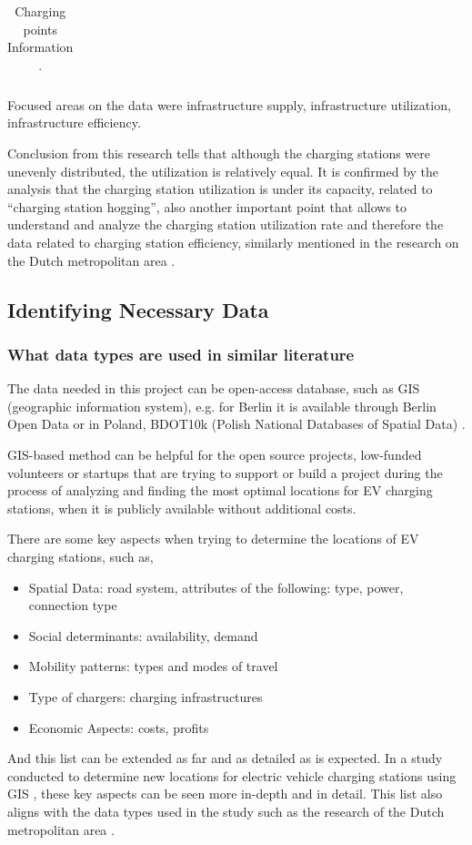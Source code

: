 \begin{table}[!h]
\begin{center}
\begin{tabular}{|l|l|l|l|l|}
\end{tabular}
\caption{Charging points Information .\cite{BerlinCampaign2024}}
\end{center}
\end{table}

Focused areas on the data were infrastructure supply, infrastructure utilization, infrastructure efficiency.

Conclusion from this research tells that although the charging stations were unevenly distributed, the utilization is relatively equal. It is confirmed by the analysis that the charging station utilization is under its capacity, related to “charging station hogging”, also another important point that allows to understand and analyze the charging station utilization rate and therefore the data related to charging station efficiency, similarly mentioned in the research on the Dutch metropolitan area \cite{Wolbertus2016}.


\subsection{Identifying Necessary Data}\label{sec:44}
\subsubsection{What data types are used in similar literature}\label{sec:45}

The data needed in this project can be open-access database, such as GIS (geographic information system), e.g. for Berlin it is available through Berlin Open Data \cite{berlin-data} or in Poland, BDOT10k (Polish National Databases of Spatial Data) \cite{bdot10k}.

GIS-based method can be helpful for the open source projects, low-funded volunteers or startups that are trying to support or build a project during the process of analyzing and finding the most optimal locations for EV charging stations, when it is publicly available without additional costs.

There are some key aspects when trying to determine the locations of EV charging stations, such as,

\begin{itemize}
    \item Spatial Data: road system, attributes of the following: type, power, connection type 
    \item Social determinants: availability, demand
    \item Mobility patterns: types and modes of travel
    \item Type of chargers: charging infrastructures
    \item Economic Aspects: costs, profits
\end{itemize}
And this list can be extended as far and as detailed as is expected.
In a study conducted to determine new locations for electric vehicle charging stations using GIS \cite{soczowka2024method}, these key aspects can be seen more in-depth and in detail. This list also aligns with the data types used in the study such as the research of the Dutch metropolitan area \cite{Wolbertus2016}.


